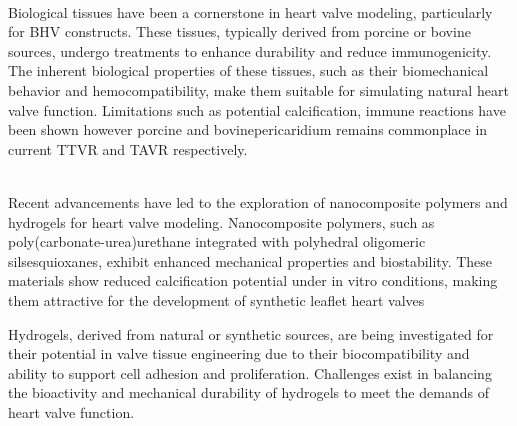 \\
Biological tissues have been a cornerstone in heart valve modeling, particularly for \gls{BHV} constructs. These tissues, typically derived from porcine or bovine sources, undergo treatments to enhance durability and reduce immunogenicity. The inherent biological properties of these tissues, such as their biomechanical behavior and hemocompatibility, make them suitable for simulating natural heart valve function. Limitations such as potential calcification, immune reactions have been shown however porcine and bovinepericaridium remains commonplace in current \gls{TTVR} and \gls{TAVR} respectively. ~

\\
Recent advancements have led to the exploration of nanocomposite polymers  and hydrogels for heart valve modeling. Nanocomposite polymers, such as poly(carbonate-urea)urethane integrated with polyhedral oligomeric silsesquioxanes, exhibit enhanced mechanical properties and biostability. These materials show reduced calcification potential under in vitro conditions, making them attractive for the development of synthetic leaflet heart valves ~

Hydrogels, derived from natural or synthetic sources, are being investigated for their potential in valve tissue engineering due to their biocompatibility and ability to support cell adhesion and proliferation. Challenges exist in balancing the bioactivity and mechanical durability of hydrogels to meet the demands of heart valve function.

